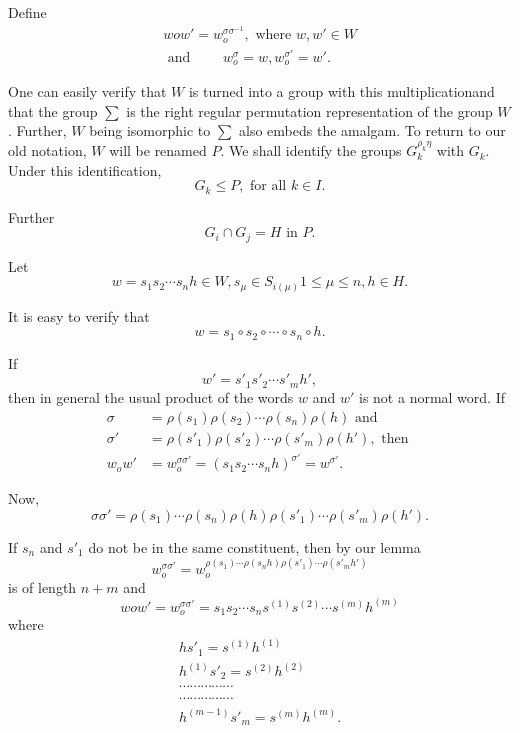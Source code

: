 Define
\begin{gather*}
  wow'  = w_o ^{\sigma \sigma^{-1}}, \text{ where }w,w' \in W\\
  \text{ and } \qquad w_o ^{\sigma } = w, w_o ^{\sigma'} = w'.
\end{gather*}

One can easily verify that $W$ is turned into a group with this
multiplication\pageoriginale and that the group $\sum$ is the right regular
permutation representation of the group $W$. Further, $W$ being
isomorphic to $\sum$ also embeds the amalgam. To return to our old
notation, $W$ will be renamed $P$. We shall identify the groups
$G_k^{\rho_k \eta}$ with $G_k$. Under this identification,  
$$
G_k \leq P, \text{ for all } k \in I.
$$

Further 
$$
G_i \cap G_j = H \text{ in } P.
$$

Let
$$
w = s_1 s_2 \cdots s_n h \in W, s_{\mu } \in S_{i
  (\mu)} 1 \leq \mu \leq n, h \in H. 
$$

It is easy to verify that
$$
w = s_1 \circ s_2 \circ \cdots \circ s_n \circ h.
$$

If
$$
w' = s'_1 s'_2 \cdots s'_m h',
$$
then in general the usual product of the words $w$ and $w'$ is not a
normal word. If 
\begin{align*}
  \sigma & = \rho(s_1) \rho(s_2) \cdots \rho(s_n) \rho(h) \text{ and }\\
  \sigma' & = \rho(s'_1)\rho(s'_2) \cdots \rho(s'_m) \rho(h'), \text{ then }\\
  w_o w' & = w_o^ {\sigma \sigma'} = (s_1 s_2 \cdots s_n h)^{\sigma'} = w^{\sigma'}.
\end{align*}

Now,\pageoriginale
$$
\sigma \sigma' = \rho(s_1) \cdots \rho(s_n) \rho(h) \rho(s'_1) \cdots
\rho(s'_m) \rho(h'). 
$$

If $s_n$ and $s'_1$ do not be in the same constituent, then  by our lemma
$$
w_o ^{\sigma \sigma'}= w_o^{\rho(s_1) \cdots \rho(s_n h) \rho(s'_1) \cdots \rho(s'_m h')}
$$
is of length $n + m$ and 
$$
 wow' = w_o ^{\sigma \sigma'} = s_1 s_2 \cdots s_n
s^{(1)}s^{(2)} \cdots s^{(m)}h^{(m)} 
$$
where
\begin{gather*}
  h s'_1 = s^{(1)} h^{(1)}\\
  h^{(1)} s'_2 = s^{(2)}h ^{(2)}\\
  \cdots \cdots \cdots \cdots \cdots\\
  \cdots \cdots \cdots \cdots \cdots \\
  h^{(m-1)}s'_m = s^{(m)} h^{(m)}.
\end{gather*}

